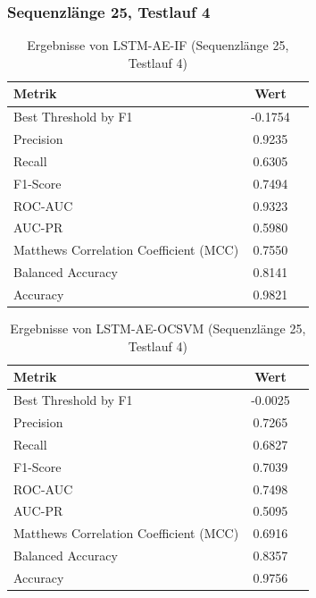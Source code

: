 \documentclass[a4paper,12pt]{article}
\begin{document}
\subsubsection{Sequenzlänge 25, Testlauf 4}
\begin{table}[H]
	\centering
	\caption{Ergebnisse von LSTM-AE-IF (Sequenzlänge 25, Testlauf 4)}
	\begin{tabular}{lcc}
		\hline
		Metrik & Wert \\
		\hline
		Best Threshold by F1 & -0.1754 \\
		Precision & 0.9235 \\
		Recall & 0.6305 \\
		F1-Score & 0.7494 \\
		ROC-AUC & 0.9323 \\
		AUC-PR & 0.5980 \\
		Matthews Correlation Coefficient (MCC) & 0.7550 \\
		Balanced Accuracy & 0.8141 \\
		Accuracy & 0.9821 \\
		\hline
	\end{tabular}
\end{table}

\begin{table}[H]
	\centering
	\caption{Ergebnisse von LSTM-AE-OCSVM (Sequenzlänge 25, Testlauf 4)}
	\begin{tabular}{lcc}
		\hline
		Metrik & Wert \\
		\hline
		Best Threshold by F1 & -0.0025 \\
		Precision & 0.7265 \\
		Recall & 0.6827 \\
		F1-Score & 0.7039 \\
		ROC-AUC & 0.7498 \\
		AUC-PR & 0.5095 \\
		Matthews Correlation Coefficient (MCC) & 0.6916 \\
		Balanced Accuracy & 0.8357 \\
		Accuracy & 0.9756 \\
		\hline
	\end{tabular}
\end{table}
\end{document}
